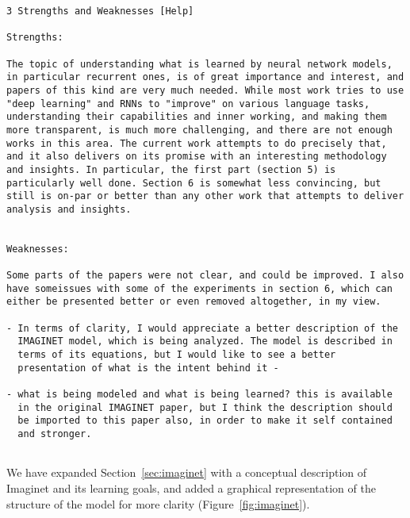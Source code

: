 \begin{verbatim}
3 Strengths and Weaknesses [Help]

Strengths:

The topic of understanding what is learned by neural network models,
in particular recurrent ones, is of great importance and interest, and
papers of this kind are very much needed. While most work tries to use
"deep learning" and RNNs to "improve" on various language tasks,
understanding their capabilities and inner working, and making them
more transparent, is much more challenging, and there are not enough
works in this area. The current work attempts to do precisely that,
and it also delivers on its promise with an interesting methodology
and insights. In particular, the first part (section 5) is
particularly well done. Section 6 is somewhat less convincing, but
still is on-par or better than any other work that attempts to deliver
analysis and insights.


Weaknesses:
 
Some parts of the papers were not clear, and could be improved. I also
have someissues with some of the experiments in section 6, which can
either be presented better or even removed altogether, in my view.

- In terms of clarity, I would appreciate a better description of the
  IMAGINET model, which is being analyzed. The model is described in
  terms of its equations, but I would like to see a better
  presentation of what is the intent behind it -

- what is being modeled and what is being learned? this is available
  in the original IMAGINET paper, but I think the description should
  be imported to this paper also, in order to make it self contained
  and stronger.
  
\end{verbatim}  

\noindent We have expanded Section~\ref{sec:imaginet} with a conceptual
description of {\sc Imaginet} and its learning goals, and added a graphical
representation of the structure of the model for more clarity (Figure~\ref{fig:imaginet}).


